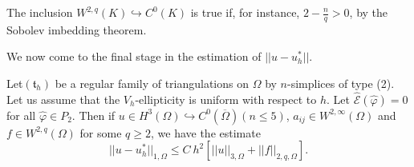\begin{remark}\label{chap8-rem8.4}
The inclusion $W^{2,q}(K)\hookrightarrow C^{0}(K)$ is true if, for
instance, $2-\frac{n}{q}>0$, by the Sobolev imbedding theorem.
\end{remark}

We now come to the final stage in the estimation of
$||u-u^{*}_{h}||$. 

\begin{theorem}\label{chap8-thm8.5}
Let\pageoriginale $(\mathfrak{t}_{h})$ be a regular family of
triangulations on $\Omega$ by $n$-simplices of type (2). Let us assume
that the $V_{h}$-ellipticity is uniform with respect to $h$. Let
$\hat{\mathscr{E}}(\hat{\varphi})=0$ for all $\hat{\varphi}\in
P_{2}$. Then if $u\in H^{3}(\Omega)\hookrightarrow
C^{0}(\overline{\Omega})(n\leq 5)$, $a_{ij}\in W^{2,\infty}(\Omega)$
and $f\in W^{2,q}(\Omega)$ for some $q\geq 2$, we have the estimate
\begin{equation*}
||u-u^{*}_{h}||_{1,\Omega}\leq
C\ h^{2}[||u||_{3,\Omega}+||f||_{2,q,\Omega}].\tag{8.40}\label{chap8-eq8.40} 
\end{equation*}
\end{theorem}

